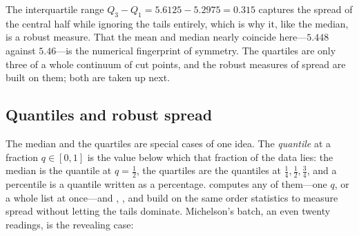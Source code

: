 \begin{codepairs}
\end{codepairs}

The interquartile range \(Q_3 - Q_1 = 5.6125 - 5.2975 = 0.315\) captures the
spread of the central half while ignoring the tails entirely, which is why it,
like the median, is a robust measure. That the mean and median nearly coincide
here---\(5.448\) against \(5.46\)---is the numerical fingerprint of symmetry. The
quartiles are only three of a whole continuum of cut points, and the robust
measures of spread are built on them; both are taken up next.

\subsection{Quantiles and robust spread}
\label{ssec:stat-quantiles}

The median and the quartiles are special cases of one idea. The \emph{quantile} at
a fraction \(q\in[0,1]\) is the value below which that fraction of the data lies:
the median is the quantile at \(q=\tfrac12\), the quartiles are the quantiles at
\(\tfrac14,\tfrac12,\tfrac34\), and a percentile is a quantile written as a
percentage.  computes any of them---one \(q\), or a whole list at
once---and , , and  build
on the same order statistics to measure spread without letting the tails dominate.
Michelson's batch, an even twenty readings, is the revealing case:


